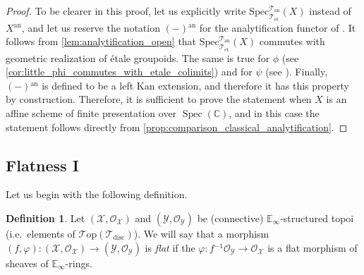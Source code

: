 \documentclass[12pt,a4paper,reqno]{amsart}
\theoremstyle{plain}
\theoremstyle{definition}
\newtheorem{defin}[thm]{Definition}
\theoremstyle{remark}
\numberwithin{equation}{section}
\begin{document}
\begin{proof}
	To be clearer in this proof, let us explicitly write ${\mathrm{Spec}^{{\mathcal T}_{\mathrm{an}}}_{{\mathcal T}_{\mathrm{\acute{e}t}}}}(X)$ instead of $X{^\mathrm{an}}$, and let us reserve the notation $(-){^\mathrm{an}}$ for the analytification functor of \cite{Porta_Yu_Higher_analytic_stacks_2014}.
	It follows from \cref{lem:analytification_open} that ${\mathrm{Spec}^{{\mathcal T}_{\mathrm{an}}}_{{\mathcal T}_{\mathrm{\acute{e}t}}}}(X)$ commutes with geometric realization of \'etale groupoids.
	The same is true for $\phi$ (see \cref{cor:little_phi_commutes_with_etale_colimits}) and for $\psi$ (see \cite{Porta_Comparison_2015}).
	Finally, $(-){^\mathrm{an}}$ is defined to be a left Kan extension, and therefore it has this property by construction.
	Therefore, it is sufficient to prove the statement when $X$ is an affine scheme of finite presentation over $\operatorname{Spec}(\mathbb C)$, and in this case the statement follows directly from \cref{prop:comparison_classical_analytification}.
\end{proof}

\subsection{Flatness I}

Let us begin with the following definition.

\begin{defin} \label{def:flat_morphism_of_structured_topoi}
	Let $({\mathcal X}, {\mathcal O}_{\mathcal X})$ and $({\mathcal Y}, {\mathcal O}_{\mathcal Y})$ be (connective) $\mathbb E_\infty$-structured topoi (i.e.\ elements of ${\mathcal T\mathrm{op}}({{\mathcal T}_{\mathrm{disc}}})$).
	We will say that a morphism $(f, \varphi) \colon ({\mathcal X}, {\mathcal O}_{\mathcal X}) \to ({\mathcal Y}, {\mathcal O}_{\mathcal Y})$ is \emph{flat} if the $\varphi \colon f{^{-1}} {\mathcal O}_{\mathcal Y} \to {\mathcal O}_{\mathcal X}$ is a flat morphism of sheaves of $\mathbb E_\infty$-rings.
\end{defin}
\end{document}
